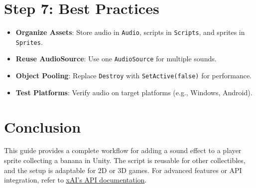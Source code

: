\documentclass[a4paper,12pt]{article}
\begin{document}
	\section{Step 7: Best Practices}
	\begin{itemize}
		\item \textbf{Organize Assets}: Store audio in \texttt{Audio}, scripts in \texttt{Scripts}, and sprites in \texttt{Sprites}.
		\item \textbf{Reuse AudioSource}: Use one \texttt{AudioSource} for multiple sounds.
		\item \textbf{Object Pooling}: Replace \texttt{Destroy} with \texttt{SetActive(false)} for performance.
		\item \textbf{Test Platforms}: Verify audio on target platforms (e.g., Windows, Android).
	\end{itemize}
	
	\section{Conclusion}
	This guide provides a complete workflow for adding a sound effect to a player sprite collecting a banana in Unity. The script is reusable for other collectibles, and the setup is adaptable for 2D or 3D games. For advanced features or API integration, refer to \href{https://x.ai/api}{xAI's API documentation}.
	
\end{document}

